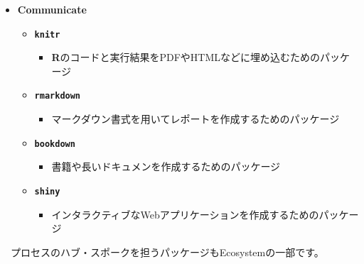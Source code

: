 \documentclass[
  12pt,
]{book}
\providecommand{\tightlist}{%
  \setlength{\itemsep}{0pt}\setlength{\parskip}{0pt}}
\begin{document}
\newpage

\begin{itemize}
\tightlist
\item
  \textbf{Communicate}

  \begin{itemize}
  \tightlist
  \item
    \textbf{\texttt{knitr}} \citep{knitr2014, R-knitr} 

    \begin{itemize}
    \tightlist
    \item
      \textbf{R}のコードと実行結果をPDFやHTMLなどに埋め込むためのパッケージ
    \end{itemize}
  \item
    \textbf{\texttt{rmarkdown}} \citep{R-rmarkdown} 

    \begin{itemize}
    \tightlist
    \item
      マークダウン書式を用いてレポートを作成するためのパッケージ
    \end{itemize}
  \item
    \textbf{\texttt{bookdown}} \citep{bookdown2016, R-bookdown} 

    \begin{itemize}
    \tightlist
    \item
      書籍や長いドキュメンを作成するためのパッケージ
    \end{itemize}
  \item
    \textbf{\texttt{shiny}} \citep{R-shiny} 

    \begin{itemize}
    \tightlist
    \item
      インタラクティブなWebアプリケーションを作成するためのパッケージ
    \end{itemize}
  \end{itemize}
\end{itemize}

　プロセスのハブ・スポークを担うパッケージもEcosystemの一部です。
\end{document}
